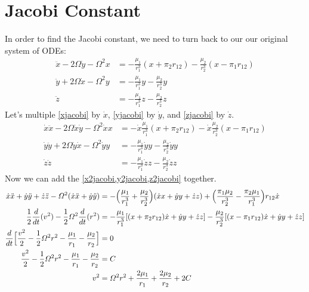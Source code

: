 \hypersetup{pageanchor = false}
\section{Jacobi Constant} 
\label{jacobi-constant}

In order to find the Jacobi constant, we need to turn back to our our original
system of ODEs:
\begin{align}
  \ddot{x} - 2\varOmega\dot{y} - \varOmega^2x
  & =   -\frac{\mu_1}{r_1^3}(x + \pi_2r_{12}) -
    \frac{\mu_2}{r_2^3}(x - \pi_1r_{12})\label{xjacobi}\\
  \ddot{y} + 2\varOmega\dot{x} - \varOmega^2y
  & =   -\frac{\mu_1}{r_1^3}y - \frac{\mu_2}{r_2^3}y\label{yjacobi}\\
  \ddot{z} & = -\frac{\mu_1}{r_1^3}z - \frac{\mu_2}{r_2^3}z\label{zjacobi}
\end{align}
Let's multiple \cref{xjacobi} by \(\dot{x}\), \cref{yjacobi} by \(\dot{y}\), and \cref{zjacobi} by \(\dot{z}\).
\begin{align}
  \dot{x}\ddot{x} - 2\varOmega\dot{x}\dot{y} - \varOmega^2\dot{x}x
  & = -\dot{x}\frac{\mu_1}{r_1^3}(x + \pi_2r_{12}) -
    \dot{x}\frac{\mu_2}{r_2^3}(x - \pi_1r_{12})\label{x2jacobi}\\
  \dot{y}\ddot{y} + 2\varOmega\dot{y}\dot{x} - \varOmega^2\dot{y}y
  & = -\frac{\mu_1}{r_1^3}\dot{y}y - \frac{\mu_2}{r_2^3}\dot{y}y
    \label{y2jacobi}\\
  \dot{z}\ddot{z}
  & = -\frac{\mu_1}{r_1^3}\dot{z}z - \frac{\mu_2}{r_2^3}\dot{z}z
    \label{z2jacobi}
\end{align}
Now we can add the \cref{x2jacobi,y2jacobi,z2jacobi} together.
\begin{align*}
  \dot{x}\ddot{x} + \dot{y}\ddot{y} + \dot{z}\ddot{z} -
  \varOmega^2(\dot{x}\ddot{x} + \dot{y}\ddot{y})
  & = -\Bigl(\frac{\mu_1}{r_1^3} + \frac{\mu_2}{r_2^3}\Bigr)(\dot{x}x +
    \dot{y}y + \dot{z}z) + \Bigl(\frac{\pi_1\mu_2}{r_2^3}
    - \frac{\pi_2\mu_1}{r_1^3}\Bigr)r_{12}\dot{x}\\
  \frac{1}{2}\frac{d}{dt}(v^2) - \frac{1}{2}\varOmega^2\frac{d}{dt}(r^2)
  & =  -\frac{\mu_1}{r_1^3}[(x + \pi_2r_{12})\dot{x} + \dot{y}y + \dot{z}z]
    - \frac{\mu_2}{r_2^3}[(x - \pi_1r_{12})\dot{x} + \dot{y}y + \dot{z}z]\\
  \frac{d}{dt}\Bigl[\frac{v^2}{2} - \frac{1}{2}\varOmega^2r^2
  - \frac{\mu_1}{r_1} - \frac{\mu_2}{r_2}\Bigr]
  & = 0\\
  \frac{v^2}{2} - \frac{1}{2}\varOmega^2r^2 - \frac{\mu_1}{r_1}
  - \frac{\mu_2}{r_2}
  & = C\\
  v^2
  & = \varOmega^2r^2 + \frac{2\mu_1}{r_1} + \frac{2\mu_2}{r_2} + 2C
\end{align*}
